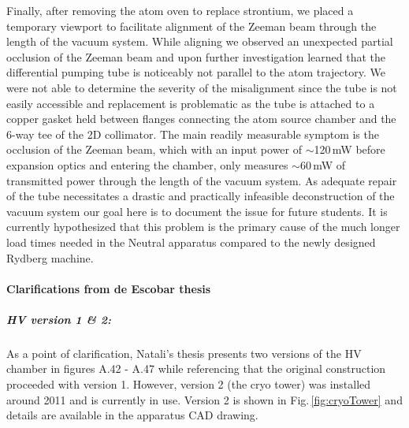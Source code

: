 Finally, after removing the atom oven to replace strontium, we placed a temporary viewport to facilitate alignment of the Zeeman beam through the length of the vacuum system. 
While aligning we observed an unexpected partial occlusion of the Zeeman beam and upon further investigation learned that the differential pumping tube is noticeably not parallel to the atom trajectory.
We were not able to determine the severity of the misalignment since the tube is not easily accessible and replacement is problematic as the tube is attached to a copper gasket held between flanges connecting the atom source chamber and the 6-way tee of the 2D collimator. 
The main readily measurable symptom is the occlusion of the Zeeman beam, which with an input power of $\sim$120\,mW before expansion optics and entering the chamber, only measures $\sim$60\,mW of transmitted power through the length of the vacuum system. 
As adequate repair of the tube necessitates a drastic and practically infeasible deconstruction of the vacuum system our goal here is to document the issue for future students.
It is currently hypothesized that this problem is the primary cause of the much longer load times needed in the Neutral apparatus compared to the newly designed Rydberg machine.

\paragraph{Clarifications from de Escobar thesis}
\subparagraph{HV version 1 \& 2:}
As a point of clarification, Natali's thesis \cite{MartinezdeEscolar2010} presents two versions of the HV chamber in figures A.42 - A.47 while referencing that the original construction proceeded with version 1. 
However, version 2 (the cryo tower) was installed around 2011 and is currently in use. Version 2 is shown in Fig.\,\ref{fig:cryoTower} and details are available in the apparatus CAD drawing.

